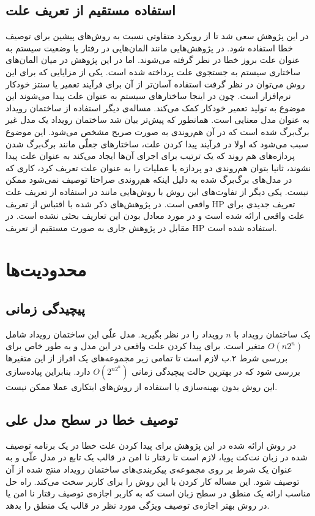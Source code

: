  \subsection{استفاده مستقیم از تعریف علت}
در این پژوهش سعی شد تا از رویکرد متفاوتی نسبت به روش‌های پیشین برای توصیف خطا استفاده شود.
در پژوهش‌هایی مانند
\cite{causality-checking,causal-hml,chockler}
المان‌هایی در رفتار یا وضعیت سیستم به عنوان علت بروز خطا در نظر گرفته می‌شوند.
اما در این پژوهش در میان المان‌های ساختاری سیستم به جستجوی علت پرداخته شده است.
یکی از مزایایی که برای این روش می‌توان در نظر گرفت استفاده آسان‌تر از آن برای فرآیند تعمیر یا سنتز خودکار نرم‌افزار است. 
چون در اینجا ساختار‌های سیستم به عنوان علت پیدا می‌شوند این موضوع به تولید تعمیر خودکار کمک می‌کند.
مساله‌ی دیگر استفاده از ساختمان رویداد به عنوان مدل معنایی است.
همانطور که پیش‌تر بیان شد ساختمان رویداد یک مدل غیر برگ‌برگ شده است که در آن هم‌روندی به صورت صریح مشخص می‌شود.
این موضوع سبب می‌شود که اولا در فرآیند پیدا کردن علت، ساختار‌های جعلّی مانند برگ‌برگ شدن پردازه‌های هم روند که یک ترتیب برای اجرای آن‌ها ایجاد می‌کند به عنوان علت پیدا نشوند، ثانیا بتوان هم‌روندی دو پردازه یا عملیات را به عنوان علت تعریف کرد، کاری که در مدل‌های برگ‌برگ شده به دلیل اینکه هم‌روندی صراحتا توصیف نمی‌شود ممکن نیست.
یکی دیگر از تفاوت‌های این روش با روش‌هایی مانند
\cite{causal-hml,causality-checking}
در استفاده از تعریف علت واقعی است.
در پژوهش‌های ذکر شده با اقتباس از تعریف
HP
تعریف جدیدی برای علت واقعی ارائه شده است و در مورد معادل بودن این تعاریف بحثی نشده است.
در مقابل در پژوهش جاری به صورت مستقیم از تعریف 
HP
استفاده شده است.

\section{محدودیت‌ها}
\subsection{پیچیدگی زمانی}
یک ساختمان رویداد با 
$n$
رویداد را در نظر بگیرید.
مدل علّی این ساختمان رویداد شامل 
$O(n2^n)$
متغیر است.
برای پیدا کردن علت واقعی در این مدل و به طور خاص برای بررسی شرط ۲.ب لازم است تا تمامی زیر مجموعه‌های یک افراز از این متغیر‌ها بررسی شود که در بهترین حالت پیچیدگی زمانی
$O(2^{n2^n})$
دارد.
بنابراین پیاده‌سازی این روش بدون بهینه‌سازی یا استفاده از روش‌های ابتکاری عملا ممکن نیست.
\subsection{توصیف خطا در سطح مدل علی}
در روش ارائه شده در این پژوهش برای پیدا کردن علت خطا در یک برنامه توصیف شده در زبان نت‌کت پویا، لازم است تا رفتار نا امن در قالب یک تابع در مدل علّی و به عنوان یک شرط بر روی مجموعه‌ی پیکربندی‌های ساختمان رویداد منتج شده از‌ آن توصیف شود.
این مساله کار کردن با این روش را برای کاربر سخت می‌کند. 
راه حل مناسب ارائه یک منطق در سطح زبان است که به کاربر اجازه‌ی توصیف رفتار نا امن یا در روش بهتر اجازه‌ی توصیف ویژگی مورد نظر در قالب یک منطق را بدهد.

